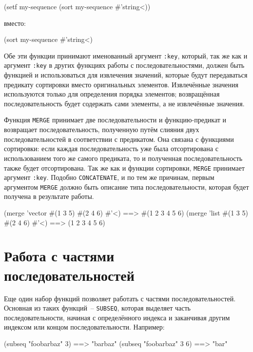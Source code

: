 \begin{myverb}
(setf my-sequence (sort my-sequence #'string<))
\end{myverb}

\noindent{}вместо:

\begin{myverb}
(sort my-sequence #'string<)
\end{myverb}

Обе эти функции принимают именованный аргумент \lstinline{:key}, который, так же как и аргумент
\lstinline{:key} в других функциях работы с последовательностями, должен быть функцией и
использоваться для извлечения значений, которые будут передаваться предикату сортировки
вместо оригинальных элементов.  Извлечённые значения используются только для определения
порядка элементов; возвращённая последовательность будет содержать сами элементы, а не
извлечённые значения.

Функция \lstinline{MERGE} принимает две последовательности и функцию-предикат и возвращает
последовательность, полученную путём слияния двух последовательностей в соответствии с
предикатом.  Она связана с функциями сортировки: если каждая последовательность
уже была отсортирована с использованием того же самого предиката, то и полученная
последовательность также будет отсортирована.  Так же как и функции сортировки,
\lstinline{MERGE} принимает аргумент \lstinline{:key}.  Подобно \lstinline{CONCATENATE}, и по тем же
причинам, первым аргументом \lstinline{MERGE} должно быть описание типа последовательности,
которая будет получена в результате работы.

\begin{myverb}
(merge 'vector #(1 3 5) #(2 4 6) #'<) ==> #(1 2 3 4 5 6)
(merge 'list #(1 3 5) #(2 4 6) #'<)   ==> (1 2 3 4 5 6)
\end{myverb}

\section{Работа с частями последовательностей}

Еще один набор функций позволяет работать с частями последовательностей.  Основная из
таких функций~-- \lstinline{SUBSEQ}, которая выделяет часть последовательности,
начиная с определённого индекса и заканчивая другим индексом или концом
последовательности.  Например:

\begin{myverb}
(subseq "foobarbaz" 3)   ==> "barbaz"
(subseq "foobarbaz" 3 6) ==> "bar"
\end{myverb}

